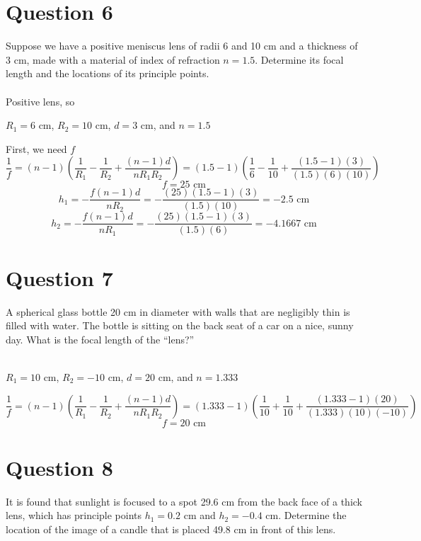 \documentclass[a4paper]{article}
\begin{document}
\section*{Question 6}
Suppose we have a positive meniscus lens of radii 6 and 10 cm and a thickness of 3 cm, made with
a material of index of refraction $n = 1.5$. Determine its focal length and the locations of its principle
points.\\\\

Positive lens, so
\begin{center}
    $R_1 = 6$ cm, $R_2 = 10$ cm, $d = 3$ cm, and $n = 1.5$
\end{center}
First, we need $f$
$$ \frac{1}{f} = (n - 1) \left(\frac{1}{R_1} - \frac{1}{R_2} + \frac{(n-1)d}{nR_1 R_2}\right) = (1.5 - 1) \left(\frac{1}{6} - \frac{1}{10} + \frac{(1.5-1)(3)}{(1.5)(6)(10)}\right)$$
$$ f = 25 \textrm{ cm} $$
$$ h_1 = - \frac{f(n-1)d}{nR_2} = - \frac{(25)(1.5-1)(3)}{(1.5)(10)} = -2.5 \textrm{ cm}$$
$$ h_2 = - \frac{f(n-1)d}{nR_1} = - \frac{(25)(1.5-1)(3)}{(1.5)(6)} = -4.1667 \textrm{ cm}$$

\section*{Question 7}
A spherical glass bottle 20 cm in diameter with walls that are negligibly thin is filled with water.
The bottle is sitting on the back seat of a car on a nice, sunny day. What is the focal length of the
“lens?”\\\\

\begin{center}
    $R_1=10$ cm, $R_2=-10$ cm, $d = 20$ cm, and $n = 1.333$
\end{center}
$$ \frac{1}{f} = (n - 1) \left(\frac{1}{R_1} - \frac{1}{R_2} + \frac{(n-1)d}{nR_1 R_2}\right) = (1.333 - 1) \left(\frac{1}{10} + \frac{1}{10} + \frac{(1.333-1)(20)}{(1.333)(10)(-10)}\right)$$
$$ f = 20 \textrm{ cm}$$


\section*{Question 8}
It is found that sunlight is focused to a spot 29.6 cm from the back face of a thick lens, which has
principle points $h_1 = 0.2$ cm and $h_2 = -0.4$ cm. Determine the location of the image of a candle that
is placed 49.8 cm in front of this lens.\\\\
\end{document}

